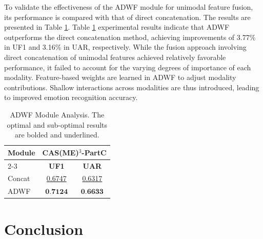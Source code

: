 \documentclass[lettersize,journal]{IEEEtran}
\begin{document}
To validate the effectiveness of the ADWF module for unimodal feature fusion, its performance is compared with that of direct concatenation. The results are presented in Table \ref{tab:table9}. Table \ref{tab:table9} experimental results indicate that ADWF outperforms the direct concatenation method, achieving improvements of 3.77\% in UF1 and 3.16\% in UAR, respectively. While the fusion approach involving direct concatenation of unimodal features achieved relatively favorable performance, it failed to account for the varying degrees of importance of each modality. Feature-based weights are learned in ADWF to adjust modality contributions. Shallow interactions across modalities are thus introduced, leading to improved emotion recognition accuracy.

\begin{table}[!t]
\caption{ADWF Module Analysis. The optimal and sub-optimal results are bolded and underlined.\label{tab:table9}}
\centering
\setlength{\tabcolsep}{26pt}
\begin{tabular}{l *{2}{c}}
\toprule[1.5pt]
\multirow{2}{*}{\textbf{Module}} &
\multicolumn{2}{c}{\textbf{CAS(ME)$^{3}$-PartC}} \\
\cmidrule[1pt]{2-3}
\multicolumn{1}{c}{} & \textbf{UF1} & \textbf{UAR} \\ \midrule[1pt]
Concat  & \underline{0.6747} & \underline{0.6317} \\
ADWF   & $\textbf{0.7124}$ & $\textbf{0.6633}$ \\
\bottomrule[1.5pt]
\end{tabular}
\end{table}

\section{Conclusion}
\end{document}
